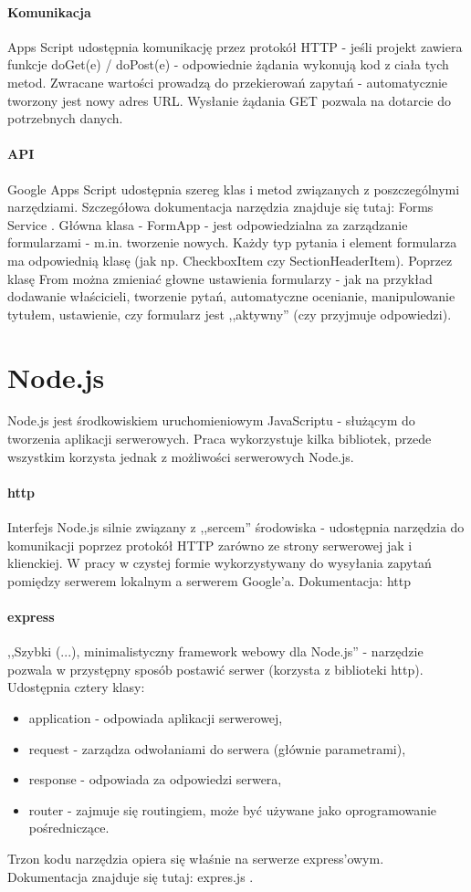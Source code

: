 \paragraph{Komunikacja}
 Apps Script udostępnia komunikację przez protokół HTTP - jeśli projekt zawiera funkcje doGet(e) / doPost(e) - odpowiednie żądania wykonują kod z ciała tych metod. Zwracane wartości prowadzą do przekierowań zapytań  - automatycznie tworzony jest nowy adres URL. Wysłanie żądania GET pozwala na dotarcie do potrzebnych danych. 
\paragraph{API}
Google Apps Script udostępnia szereg klas i metod związanych z poszczególnymi narzędziami. Szczegółowa dokumentacja narzędzia znajduje się tutaj: Forms Service \cite{FormsService}.
 Główna klasa - FormApp - jest odpowiedzialna za zarządzanie formularzami - m.in. tworzenie nowych. Każdy typ pytania i element formularza ma odpowiednią klasę (jak np. CheckboxItem czy SectionHeaderItem). Poprzez klasę From  można zmieniać głowne ustawienia formularzy  - jak na przykład dodawanie właścicieli, tworzenie pytań, automatyczne ocenianie, manipulowanie tytułem, ustawienie, czy formularz jest ,,aktywny'' (czy przyjmuje odpowiedzi).
 
 
\section{Node.js}
Node.js jest środkowiskiem uruchomieniowym JavaScriptu - służącym do tworzenia aplikacji serwerowych. 
Praca wykorzystuje kilka bibliotek, przede wszystkim korzysta jednak z możliwości serwerowych Node.js. 
\paragraph{http}
Interfejs Node.js silnie związany z ,,sercem'' środowiska - udostępnia narzędzia do komunikacji poprzez protokół  HTTP zarówno ze strony serwerowej jak i klienckiej. W pracy w czystej formie wykorzystywany do wysyłania zapytań pomiędzy serwerem lokalnym a serwerem Google'a.
\newline Dokumentacja: http  \cite{https}
\paragraph{express}
,,Szybki (...), minimalistyczny framework webowy dla Node.js'' - narzędzie pozwala w przystępny sposób postawić serwer (korzysta z biblioteki http). Udostępnia cztery klasy:
\begin{itemize}
\item application - odpowiada aplikacji serwerowej,
\item  request - zarządza odwołaniami do serwera (głównie parametrami),
\item response - odpowiada za odpowiedzi serwera,
\item router - zajmuje się routingiem, może być używane jako oprogramowanie pośredniczące.
\end{itemize}
Trzon kodu narzędzia opiera się właśnie na serwerze express'owym.
\ind Dokumentacja znajduje się tutaj: expres.js \cite{express}.
